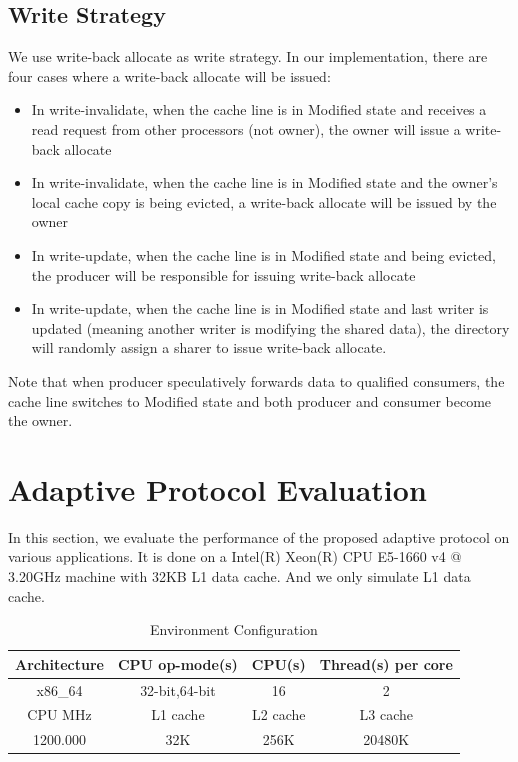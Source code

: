 \documentclass[11pt,conference]{IEEEtran}
\begin{document}
\subsection{Write Strategy}
We use write-back allocate as write strategy. In our implementation, there are four cases where a write-back allocate will be issued:
\begin{itemize}
  \item In write-invalidate, when the cache line is in Modified state and receives a read request from other processors (not owner), the owner will issue a write-back allocate
  \item In write-invalidate, when the cache line is in Modified state and the owner's local cache copy is being evicted, a write-back allocate will be issued by the owner
  \item In write-update, when the cache line is in Modified state and being evicted, the producer will be responsible for issuing write-back allocate
  \item In write-update, when the cache line is in Modified state and last writer is updated (meaning another writer is modifying the shared data), the directory will randomly assign a sharer to issue write-back allocate.
\end{itemize}
Note that when producer speculatively forwards data to qualified consumers, the cache line switches to Modified state and both producer and consumer become the owner.


\section{Adaptive Protocol Evaluation}
In this section, we evaluate the performance of the proposed adaptive protocol on various applications. It is done on a Intel(R) Xeon(R) CPU E5-1660 v4 @ 3.20GHz machine with 32KB L1 data cache. And we only simulate L1 data cache.

\begin{table}[!h]
\renewcommand{\arraystretch}{2.5}
\caption{Environment  Configuration}
\label{envir_config}
\centering
\begin{tabular}{|c|c|c|c|}
\hline
Architecture & CPU op-mode(s) & CPU(s) & Thread(s) per core \\
\hline
x86\_64 & 32-bit,64-bit & 16 & 2 \\
\hline
CPU MHz & L1 cache & L2 cache & L3 cache \\
\hline
1200.000 & 32K & 256K & 20480K \\
\hline
\end{tabular}
\end{table}
\FloatBarrier
\end{document}
